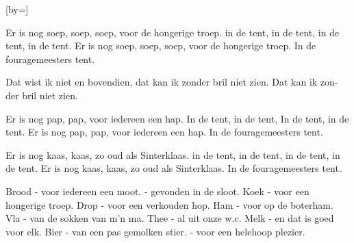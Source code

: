 

[by=]




\beginverse
Er is nog soep, soep, soep,  \brk  voor de hongerige troep.
in de tent, in de tent, \brk  in de tent, in de tent.
Er is nog soep, soep, soep,  \brk  voor de hongerige troep.
In de fouragemeesters tent.
\endverse

\beginchorus
Dat wist ik niet en bovendien,
dat kan ik zonder bril niet zien.
Dat kan ik zon-der bril niet zien.
\endchorus

\beginverse
Er is nog pap, pap, \brk  voor iedereen een hap.
In de tent, in de tent, \brk  In de tent, in de tent.
Er is nog pap, pap, \brk  voor iedereen een hap.
In de fouragemeesters tent.
\endverse

\beginchorus
Er is nog kaas, kaas, \brk  zo oud als Sinterklaas.
in de tent, in de tent, \brk  in de tent, in de tent.
Er is nog kaas, kaas, \brk  zo oud als Sinterklaas.
In de fouragemeesters tent.
\endchorus

\beginverse
{}
Brood - voor iedereen een moot. - gevonden in de sloot.
Koek - voor een hongerige troep.
Drop - voor een verkouden hop.
Ham - voor op de boterham.
Vla - van de sokken van m'n ma.
Thee - al uit onze w.c.
Melk - en dat is goed voor elk.
Bier - van een pas gemolken stier. - voor een helehoop plezier.
\endverse









\endsong
